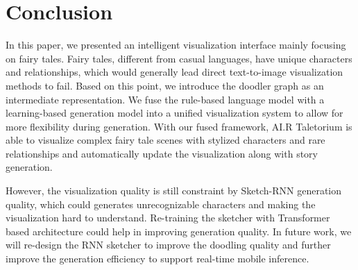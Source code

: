 \section{Conclusion}

In this paper, we presented an intelligent visualization interface mainly focusing on fairy tales. Fairy tales, different from casual languages, have unique characters and relationships, which would generally lead direct text-to-image visualization methods to fail. Based on this point, we introduce the doodler graph as an intermediate representation. We fuse the rule-based language model with a learning-based generation model into a unified visualization system to allow for more flexibility during generation. With our fused framework, AI.R Taletorium is able to visualize complex fairy tale scenes with stylized characters and rare relationships and automatically update the visualization along with story generation. 

However, the visualization quality is still constraint by Sketch-RNN generation quality, which could generates unrecognizable characters and making the visualization hard to understand. Re-training the sketcher with Transformer based architecture could help in improving generation quality. In future work, we will re-design the RNN sketcher to improve the doodling quality and further improve the generation efficiency to support real-time mobile inference.